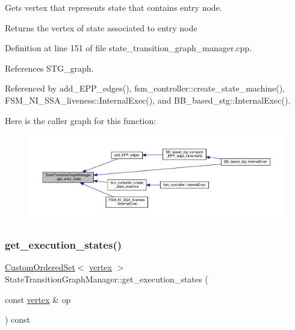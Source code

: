 Gets vertex that represents state that contains entry node. 

\begin{DoxyReturn}{Returns}
the vertex of state associated to entry node 
\end{DoxyReturn}


Definition at line 151 of file state\+\_\+transition\+\_\+graph\+\_\+manager.\+cpp.



References S\+T\+G\+\_\+graph.



Referenced by add\+\_\+\+E\+P\+P\+\_\+edges(), fsm\+\_\+controller\+::create\+\_\+state\+\_\+machine(), F\+S\+M\+\_\+\+N\+I\+\_\+\+S\+S\+A\+\_\+liveness\+::\+Internal\+Exec(), and B\+B\+\_\+based\+\_\+stg\+::\+Internal\+Exec().

Here is the caller graph for this function\+:
\nopagebreak
\begin{figure}[H]
\begin{center}
\leavevmode
\includegraphics[width=350pt]{d9/dfd/classStateTransitionGraphManager_acb90f4df2f87498dc08fa9303e7adae5_icgraph}
\end{center}
\end{figure}
\mbox{\label{classStateTransitionGraphManager_afdd93a2fc9f27b2c795bef76f62a07f8}} 
\subsubsection{\texorpdfstring{get\+\_\+execution\+\_\+states()}{get\_execution\_states()}}
{\footnotesize\ttfamily \hyperlink{classCustomOrderedSet}{Custom\+Ordered\+Set}$<$ \hyperlink{graph_8hpp_abefdcf0544e601805af44eca032cca14}{vertex} $>$ State\+Transition\+Graph\+Manager\+::get\+\_\+execution\+\_\+states (\begin{DoxyParamCaption}\item[{const \hyperlink{graph_8hpp_abefdcf0544e601805af44eca032cca14}{vertex} \&}]{op }\end{DoxyParamCaption}) const}



